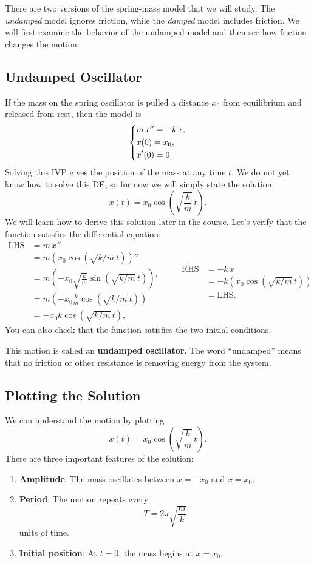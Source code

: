 \documentclass[11pt,letterpaper]{article}
\begin{document}
There are two versions of the spring-mass model that we will study. The \textit{undamped} model ignores friction, while the \textit{damped} model includes friction. We will first examine the behavior of the undamped model and then see how friction changes the motion.


\subsection{Undamped Oscillator}

If the mass on the spring oscillator is pulled a distance $x_0$ from equilibrium and released from rest, then the model is 
\[
\begin{dcases}
    m\,x''=-k\,x,\\
    x(0)=x_0,\\
    x'(0)=0.
\end{dcases}
\]
Solving this IVP gives the position of the mass at any time $t$. We do not yet know how to solve this DE, so for now we will simply state the solution:
\[
x(t)=x_0\cos\left(\sqrt{\frac{k}{m}}\,t\right).
\]
We will learn how to derive this solution later in the course. Let's verify that the function satisfies the differential equation:
\[
\begin{aligned}
\text{LHS}&=m\,x''\\
           &=m\left(x_0 \cos(\sqrt{k/m}\,t)\right)''\\
           &=m\left(-x_0\sqrt{\frac{k}{m}}
             \sin(\sqrt{k/m}\,t)\right)'\\
           &=m\left(-x_0\frac{k}{m}
             \cos(\sqrt{k/m}\,t)\right)\\
           &=-x_0k\cos(\sqrt{k/m}\,t),
\end{aligned}
\qquad
\begin{aligned}
\text{RHS}&=-k\,x\\
           &=-k\left(x_0\cos(\sqrt{k/m}\,t)\right)\\
           &=\text{LHS}.
\end{aligned}
\]
You can also check that the function satisfies the two initial conditions.

This motion is called an \textbf{undamped oscillator}. The word ``undamped'' means that no friction or other resistance is removing energy from the system.


\subsection{Plotting the Solution}
We can understand the motion by plotting
\[
x(t)=x_0\cos\left(\sqrt{\frac{k}{m}}\,t\right).
\]
There are three important features of the solution:
\begin{enumerate}
    \item \textbf{Amplitude}: The mass oscillates between $x=-x_0$ and $x=x_0$.
    
    \item \textbf{Period}: The motion repeats every
    \[
    T=2\pi\sqrt{\frac{m}{k}}
    \]
    units of time.
    
    \item \textbf{Initial position}: At $t=0$, the mass begins at $x=x_0$.
\end{enumerate}
\end{document}

